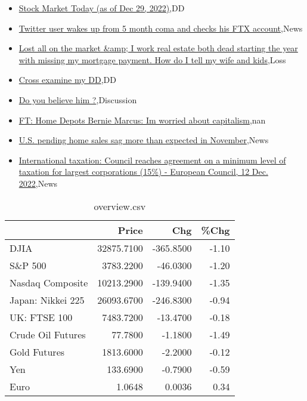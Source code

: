 \documentclass{article}%
\begin{document}
%
\begin{itemize}%
\item%
\href{https://reddit.com/r/wallstreetbets/comments/zy3k6x/stock\_market\_today\_as\_of\_dec\_29\_2022/}{Stock Market Today (as of Dec 29, 2022)},DD%
\item%
\href{https://reddit.com/r/wallstreetbets/comments/zy392p/twitter\_user\_wakes\_up\_from\_5\_month\_coma\_and/}{Twitter user wakes up from 5 month coma and checks his FTX account},News%
\item%
\href{https://reddit.com/r/wallstreetbets/comments/zy1r88/lost\_all\_on\_the\_market\_i\_work\_real\_estate\_both/}{Lost all on the market \&amp; I work real estate both dead starting the year with missing my mortgage payment. How do I tell my wife and kids},Loss%
\item%
\href{https://reddit.com/r/Baystreetbets/comments/zxorkq/cross\_examine\_my\_dd/}{Cross examine my DD},DD%
\item%
\href{https://reddit.com/r/StockMarket/comments/zxzfey/do\_you\_believe\_him/}{Do you believe him ?},Discussion%
\item%
\href{https://reddit.com/r/Economics/comments/zy0jw9/ft\_home\_depots\_bernie\_marcus\_im\_worried\_about/}{FT: Home Depots Bernie Marcus: Im worried about capitalism},nan%
\item%
\href{https://reddit.com/r/Economics/comments/zxwc1l/us\_pending\_home\_sales\_sag\_more\_than\_expected\_in/}{U.S. pending home sales sag more than expected in November},News%
\item%
\href{https://reddit.com/r/Economics/comments/zxp9on/international\_taxation\_council\_reaches\_agreement/}{International taxation: Council reaches agreement on a minimum level of taxation for largest corporations (15\%) - European Council, 12 Dec. 2022},News%
\end{itemize}%


\begin{table}[htbp]%
\caption{overview.csv}%
\centering%
\begin{adjustbox}{width=1\textwidth}%
\begin{tabular}{lrrr}
\toprule
                  &      Price &       Chg &  \%Chg \\
\midrule
             DJIA & 32875.7100 & -365.8500 & -1.10 \\
          S\&P 500 &  3783.2200 &  -46.0300 & -1.20 \\
 Nasdaq Composite & 10213.2900 & -139.9400 & -1.35 \\
Japan: Nikkei 225 & 26093.6700 & -246.8300 & -0.94 \\
     UK: FTSE 100 &  7483.7200 &  -13.4700 & -0.18 \\
Crude Oil Futures &    77.7800 &   -1.1800 & -1.49 \\
     Gold Futures &  1813.6000 &   -2.2000 & -0.12 \\
              Yen &   133.6900 &   -0.7900 & -0.59 \\
             Euro &     1.0648 &    0.0036 &  0.34 \\
\bottomrule
\end{tabular}
%
\end{adjustbox}%
\end{table}
\end{document}
